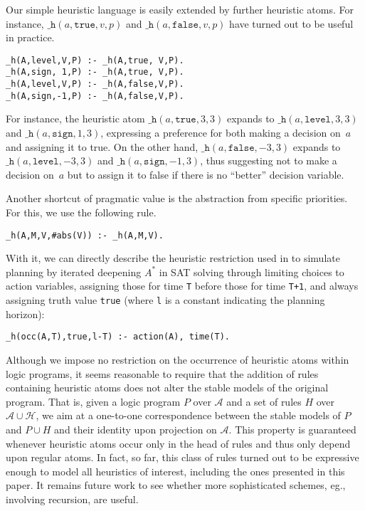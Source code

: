 \documentclass[letterpaper]{article}
\newcommand{\hpredicate}{\texttt{\_h}}
\newcommand{\hpred}[4]{\ensuremath{\hpredicate(#1,{#2},#3,#4)}}
\begin{document}
Our simple heuristic language is easily extended by further heuristic atoms.
For instance, \hpred{a}{\mathtt{true}}{v}{p} and \hpred{a}{\mathtt{false}}{v}{p} have turned out to be useful in practice.
\begin{lstlisting}
_h(A,level,V,P) :- _h(A,true, V,P).
_h(A,sign, 1,P) :- _h(A,true, V,P).
_h(A,level,V,P) :- _h(A,false,V,P).
_h(A,sign,-1,P) :- _h(A,false,V,P).
\end{lstlisting}
%
For instance, the heuristic atom \hpred{a}{\mathtt{true}}{3}{3} expands to 
\hpred{a}{\mathtt{level}}{3}{3} and \hpred{a}{\mathtt{sign}}{1}{3},
expressing a preference for both making a decision on~$a$ and
assigning it to true.
On the other hand,
\hpred{a}{\mathtt{false}}{-3}{3} expands to 
\hpred{a}{\mathtt{level}}{-3}{3} and \hpred{a}{\mathtt{sign}}{-1}{3},
thus suggesting not to make a decision on~$a$ but to
assign it to false if there is no ``better'' decision variable.

Another shortcut of pragmatic value is the abstraction from specific priorities.
For this, we use the following rule.
\begin{lstlisting}
_h(A,M,V,#abs(V)) :- _h(A,M,V).
\end{lstlisting}
With it,
we can directly describe the heuristic restriction used in \cite{rintanen11a} to simulate planning
by iterated deepening $A^*$ \cite{korf85a} in SAT solving through limiting choices to action variables,
assigning those for time \texttt{T} before those for time \texttt{T+1}, and always assigning truth
value \texttt{true} (where \texttt{l} is a constant indicating the planning horizon):
\begin{lstlisting}
_h(occ(A,T),true,l-T) :- action(A), time(T).
\end{lstlisting}

Although we impose no restriction on the occurrence of heuristic atoms within logic programs,
it seems reasonable to require that the addition of rules containing heuristic atoms does not alter
the stable models of the original program.
That is, given a logic program $P$ over $\mathcal{A}$ and a set of rules $H$ over $\mathcal{A}\cup\mathcal{H}$,
we aim at a one-to-one correspondence between the stable models of $P$ and $P\cup H$ and
their identity upon projection on $\mathcal{A}$.
This property is guaranteed whenever heuristic atoms occur only in the head of rules and thus only
depend upon regular atoms.
In fact, so far, this class of rules turned out to be expressive enough to model all heuristics of interest,
including the ones presented in this paper.
It remains future work to see whether more sophisticated schemes, eg., involving recursion, are useful.
\end{document}
